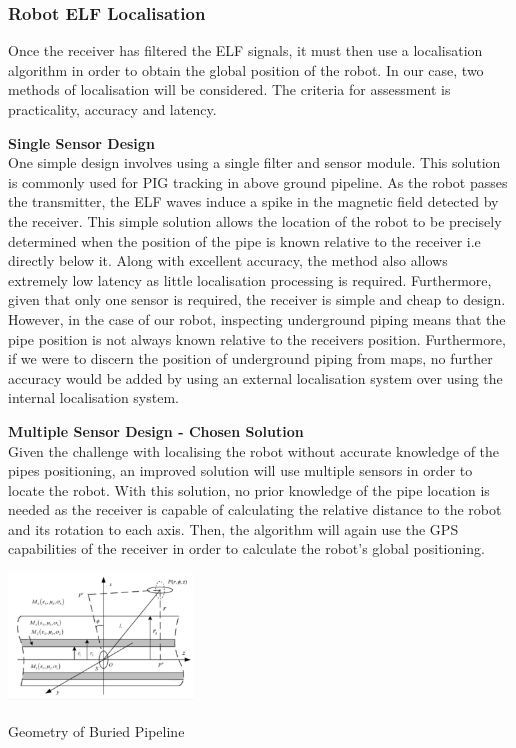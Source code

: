 \documentclass[11pt]{article}		%
\newcommand{\supercite}[1]{\textsuperscript{\cite{#1}}}		%
\begin{document}
			\subsubsection{Robot ELF Localisation} \label{elfLocalisation}
			
			Once the receiver has filtered the ELF signals, it must then use a localisation algorithm in order to obtain the global position of the robot. In our case, two methods of localisation will be considered. The criteria for assessment is practicality, accuracy and latency. 
			
			\textbf{Single Sensor Design}
			\\
			One simple design involves using a single filter and sensor module. This solution is commonly used for PIG tracking in above ground pipeline. As the robot passes the transmitter, the ELF waves induce a spike in the magnetic field detected by the receiver. This simple solution allows the location of the robot to be precisely determined when the position of the pipe is known relative to the receiver i.e directly below it. Along with excellent accuracy, the method also allows extremely low latency as little localisation processing is required. Furthermore, given that only one sensor is required, the receiver is simple and cheap to design. 
			\\
	    	\hspace*{3ex}However, in the case of our robot, inspecting underground piping means that the pipe position is not always known relative to the receivers position. Furthermore, if we were to discern the position of underground piping from maps, no further accuracy would be added by using an external localisation system over using the internal localisation system. 
	
	        \textbf{Multiple Sensor Design - Chosen Solution}
			\\
		    Given the challenge with localising the robot without accurate knowledge of the pipes positioning, an improved solution will use multiple sensors in order to locate the robot. With this solution, no prior knowledge of the pipe location is needed as the receiver is capable of calculating the relative distance to the robot and its rotation to each axis. Then, the algorithm will again use the GPS capabilities of the receiver in order to calculate the robot's global positioning.
			
			\begin{floatingfigure}[r]{0.4\textwidth}
				\centering
				\includegraphics[width=0.37\textwidth]{localisation}
				\caption{Geometry of Buried Pipeline\supercite{ELFTransmitter}}
				\label{localisation}
			\end{floatingfigure}
			
\end{document}
